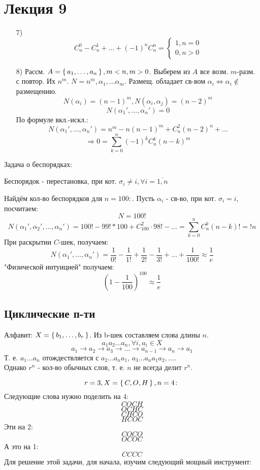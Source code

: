 \section{Лекция 9}
\begin{itemize}
  \item [7) ] \[
  C_{n}^{0} - C_{n}^{1} + \ldots + (-1)^{n} C_{n}^{n} = \begin{cases}
  1, n = 0 \\
  0, n > 0
  \end{cases}
  \]
\item [8) ] Рассм. $A = \set{a_1, \ldots, a_n}, m < n, m > 0$. Выберем из $A$ все возм. $m$-разм. с повтор. Их $n^{m}$. $N = n^{m}, \alpha_1, \ldots \alpha_m$. Размещ. обладает св-вом $\alpha_i \iff \alpha_i \not\in$ размещению. 
  \[
  N(\alpha_i) = (n - 1)^{m}, N(\alpha_i, \alpha_j) = (n - 2)^{m}
  \]
  \[
  N(\alpha_1', \ldots, \alpha_n') = 0
  \]
  По формуле вкл.-искл.:
  \[
  N(\alpha_1', \ldots, \alpha_n') = n^{m} - n(n - 1)^{m} + C_{n}^{2}(n - 2)^{n} + \ldots
  \]
  \[
  \Rightarrow 0 = \sum_{k = 0}^{n} (-1)^{k} C_{n}^{k} (n - k)^{m}
  \]
\end{itemize}
\begin{task}
Задача о беспорядках: \\
\begin{definition}
Беспорядок - перестановка, при кот. $\sigma_i \neq i, \forall i = \overline{1,n}$
\end{definition}
Найдём кол-во беспорядков для $n = 100\colon$. Пусть $\alpha_i$ - св-во, при кот. $\sigma_i = i$, посчитаем:
\[
N = 100!
\]
\[
N(\alpha_1', \alpha_2', \ldots, \alpha_n') = 100! - 99! * 100 + C_{100}^{2} \cdot 98! - \ldots = \sum_{k = 0}^{n} C_{n}^{k} (n - k)! = !n
\]
При раскрытии $C$-шек, получаем:
\[
N(\alpha_1', \ldots, \alpha_n') = \frac{1}{0!} - \frac{1}{1!} + \frac{1}{2!} - \frac{1}{3!} + \ldots + \frac{1}{100!}\approx \frac{1}{e}
\]
"Физической интуицией" получаем:
\[
\left(1 - \frac{1}{100}\right)^{100} \approx \frac{1}{e}
\]
\end{task}
\subsection{Циклические п-ти}
Алфавит: $X = \set{b_1, \ldots, b_r}$. Из b-шек составляем слова длины $n$.
\[
a_1a_2\ldots a_n, \forall i, a_i \in X
\]
\[
a_1 \rightarrow a_2 \rightarrow a_3 \rightarrow \ldots \rightarrow a_{n - 1} \rightarrow a_n \rightarrow a_1
\]
Т. е. $a_1\ldots a_n$ отождествляется с $a_2\ldots a_n a_1$, $a_3\ldots a_n a_1 a_2, \ldots$.\\
Однако $r^{n}$ - кол-во обычных слов, т. е. $n$ не всегда делит $r^{n}$. 
\begin{example}
\[
r = 3, X = \set{C, O, H}, n = 4\colon
\]
Следующие слова нужно поделить на 4:
\[
COCH
\]
\[
OCHC
\]
\[
CHCO
\]
\[
HCOC
\]
Эти на 2:
\[
COCO
\]
\[
OCOC
\]
А это на 1:
\[
CCCC
\]
Для решение этой задачи, для начала, изучим следующий мощный инструмент:
\end{example}
